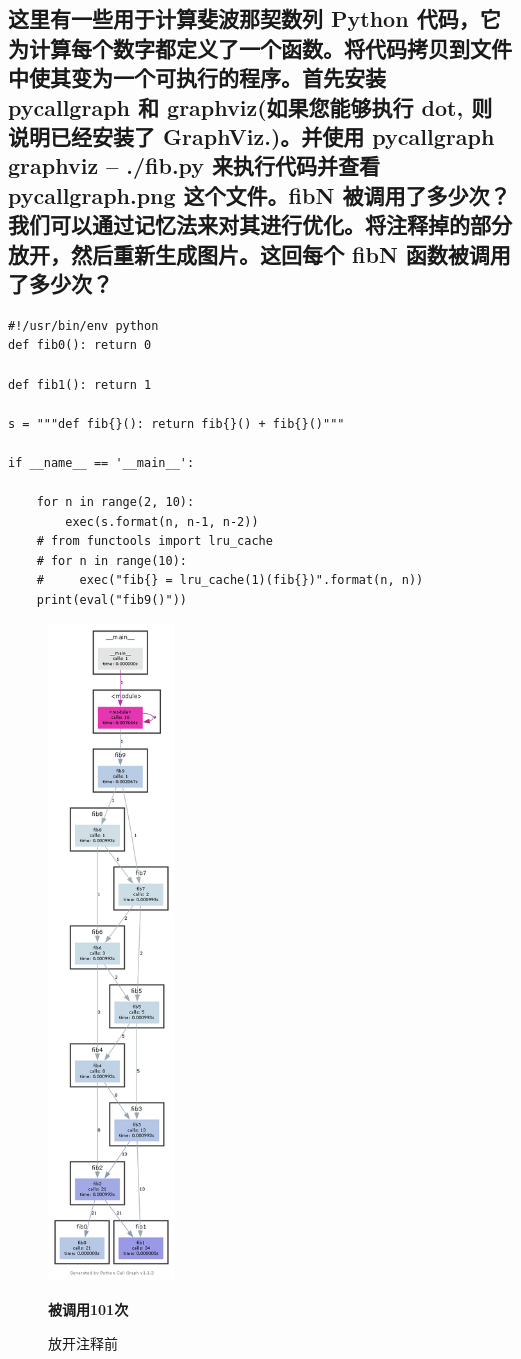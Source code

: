 \documentclass[UTF8,a4paper]{ctexart}
\begin{document}
\subsection{这里有一些用于计算斐波那契数列 Python 代码，它为计算每个数字都定义了一个函数。将代码拷贝到文件中使其变为一个可执行的程序。首先安装 pycallgraph 和 graphviz(如果您能够执行 dot, 则说明已经安装了 GraphViz.)。并使用 pycallgraph graphviz -- ./fib.py 来执行代码并查看 pycallgraph.png 这个文件。fibN 被调用了多少次？我们可以通过记忆法来对其进行优化。将注释掉的部分放开，然后重新生成图片。这回每个 fibN 函数被调用了多少次？}
\begin{lstlisting}
#!/usr/bin/env python
def fib0(): return 0

def fib1(): return 1

s = """def fib{}(): return fib{}() + fib{}()"""

if __name__ == '__main__':

    for n in range(2, 10):
        exec(s.format(n, n-1, n-2))
    # from functools import lru_cache
    # for n in range(10):
    #     exec("fib{} = lru_cache(1)(fib{})".format(n, n))
    print(eval("fib9()")) 
\end{lstlisting}
\begin{figure}[H]
    \centering
    \includegraphics[width=0.3\textwidth]{./python/pycallgraph1.png}
    \caption{放开注释前}
    \textbf{\textcolor{color1}{被调用101次}}
\end{figure}
\end{document}
